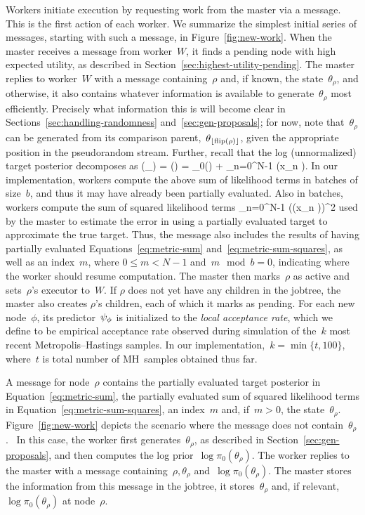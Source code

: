\documentclass[angelino.tex]{subfiles}
\begin{document}
Workers initiate execution by requesting work from the master via a
\WANTWORK message.  This is the first action of each worker.
%
We summarize the simplest initial series of messages, starting with such a
\WANTWORK message, in Figure~\ref{fig:new-work}.
%
When the master receives a \WANTWORK message from worker~$W$,
it finds a pending node with high expected utility, as described in 
Section~\ref{sec:highest-utility-pending}.
%
The master replies to worker~$W$ with a \HAVEWORK message
containing~$\rho$ and, if known, the state~$\theta_\rho$, and otherwise,
it also contains whatever information is available to generate~$\theta_\rho$
most efficiently.
%
Precisely what information this is will become clear in
Sections~\ref{sec:handling-randomness} and~\ref{sec:gen-proposals};
for now, note that~$\theta_\rho$ can be generated from its comparison
parent,~$\theta_{{\lfloor{\text{flip}(\rho)}\rfloor}}$, given the appropriate
position in the pseudorandom stream.
Further, recall that the log (unnormalized) target posterior decomposes as
\be
{\mcL}(\theta_\rho) = \log \pi(\theta \given \x) =
\log \pi_0(\theta) + \sum_{n=0}^{N-1} \log\pi(x_n \given \theta).
\label{eq:metric-sum}
\ee
In our implementation, workers compute the above sum of likelihood terms 
in batches of size~$b$, and thus it may have already been partially evaluated.
Also in batches, workers compute the sum of squared likelihood terms
\be
\sum_{n=0}^{N-1} (\log\pi(x_n \given \theta))^2
\label{eq:metric-sum-squares}
\ee
used by the master to estimate the error in using a partially
evaluated target to approximate the true target.	
Thus, the \HAVEWORK message also includes the results of having partially
evaluated Equations~\ref{eq:metric-sum} and~\ref{eq:metric-sum-squares},	
as well as an index~$m$, where ${0 \le m < N-1}$ and~${m \mod b = 0}$,
indicating where the worker should resume computation.
%
The master then marks~$\rho$ as active and sets~$\rho$'s executor to~$W$.
%
If $\rho$ does not yet have any children in the jobtree, the
master also creates $\rho$'s children, each of which it marks as pending.
For each new node~$\phi$, its predictor~$\psi_{\phi}$ 
is initialized to the \emph{local acceptance rate}, which we define to be
empirical acceptance rate observed during simulation of the~$k$ most
recent Metropolis--Hastings samples.
In our implementation,~${k = \min\{t, 100\}}$, where~$t$ is total number of
MH~samples obtained thus far.


A \HAVEWORK message for node~$\rho$ contains the partially evaluated target
posterior in Equation~\ref{eq:metric-sum}, the partially evaluated sum of
squared likelihood terms in Equation~\ref{eq:metric-sum-squares}, an index~$m$
and, if~$m > 0$, the state~$\theta_\rho$.
%
Figure~\ref{fig:new-work} depicts the scenario where the \HAVEWORK message does
not contain~$\theta_\rho$.~
In this case, the worker first generates~$\theta_\rho$,
as described in Section~\ref{sec:gen-proposals},
and then computes the log prior~$\log\pi_0(\theta_\rho)$.
The worker replies to the master with a \SETPROPOSAL message
containing~${\rho, \theta_\rho}$ and~$\log\pi_0(\theta_\rho)$.
The master stores the information from this message in the jobtree, \ie it 
stores~$\theta_\rho$ and, if relevant,~$\log \pi_0(\theta_\rho)$ at node~$\rho$.
\end{document}
